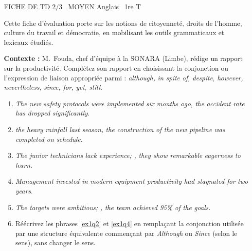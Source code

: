 \documentclass[11pt]{article}
\begin{document}
\begin{tcolorbox}[enhanced,colback=popink,colframe=popink,arc=10pt,boxrule=0pt,left=12pt,right=12pt,top=9pt,bottom=9pt]
{\color{white}\popxbold\small FICHE DE TD 2/3 \textbullet\ MOYEN \hfill Anglais \textbullet\ 1re T\par}
\end{tcolorbox}
\vspace{4pt}
Cette fiche d'évaluation porte sur les notions de citoyenneté, droits de l'homme, culture du travail et démocratie, en mobilisant les outils grammaticaux et lexicaux étudiés.

\begin{exercice}
\textbf{Contexte :} M.~Fouda, chef d'équipe à la SONARA (Limbe), rédige un rapport sur la productivité. Complétez son rapport en choisissant la conjonction ou l'expression de liaison appropriée parmi : \textit{although, in spite of, despite, however, nevertheless, since, for, yet, still}.

\begin{enumerate}
\item \label{ex1q1} \textit{The new safety protocols were implemented six months ago, \underline{\hspace{3cm}} the accident rate has dropped significantly.}
\item \label{ex1q2} \textit{\underline{\hspace{3cm}} the heavy rainfall last season, the construction of the new pipeline was completed on schedule.}
\item \label{ex1q3} \textit{The junior technicians lack experience; \underline{\hspace{3cm}}, they show remarkable eagerness to learn.}
\item \label{ex1q4} \textit{Management invested in modern equipment \underline{\hspace{3cm}} productivity had stagnated for two years.}
\item \label{ex1q5} \textit{The targets were ambitious; \underline{\hspace{3cm}}, the team achieved 95\% of the goals.}
\item \label{ex1q6} Réécrivez les phrases \ref{ex1q2} et \ref{ex1q4} en remplaçant la conjonction utilisée par une structure équivalente commençant par \textit{Although} ou \textit{Since} (selon le sens), sans changer le sens.
\end{enumerate}
\end{exercice}
\end{document}
